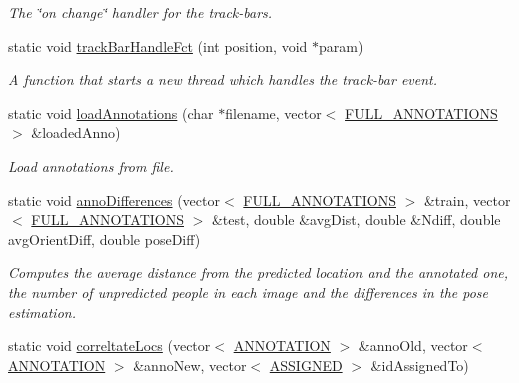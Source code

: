 \begin{DoxyCompactItemize}
\begin{DoxyCompactList}\small\item\em The \char`\"{}on change\char`\"{} handler for the track-\/bars. \item\end{DoxyCompactList}\item 
\hypertarget{classannotationsHandle_a6449c025574a5b0aae30a9b38fe598d6}{
static void \hyperlink{classannotationsHandle_a6449c025574a5b0aae30a9b38fe598d6}{trackBarHandleFct} (int position, void $\ast$param)}
\label{classannotationsHandle_a6449c025574a5b0aae30a9b38fe598d6}

\begin{DoxyCompactList}\small\item\em A function that starts a new thread which handles the track-\/bar event. \item\end{DoxyCompactList}\item 
\hypertarget{classannotationsHandle_a85794f6ce173c1109237e357b85fb884}{
static void \hyperlink{classannotationsHandle_a85794f6ce173c1109237e357b85fb884}{loadAnnotations} (char $\ast$filename, vector$<$ \hyperlink{structannotationsHandle_1_1FULL__ANNOTATIONS}{FULL\_\-ANNOTATIONS} $>$ \&loadedAnno)}
\label{classannotationsHandle_a85794f6ce173c1109237e357b85fb884}

\begin{DoxyCompactList}\small\item\em Load annotations from file. \item\end{DoxyCompactList}\item 
\hypertarget{classannotationsHandle_a04cf8b0e62ecb0b9f4556e489f126195}{
static void \hyperlink{classannotationsHandle_a04cf8b0e62ecb0b9f4556e489f126195}{annoDifferences} (vector$<$ \hyperlink{structannotationsHandle_1_1FULL__ANNOTATIONS}{FULL\_\-ANNOTATIONS} $>$ \&train, vector$<$ \hyperlink{structannotationsHandle_1_1FULL__ANNOTATIONS}{FULL\_\-ANNOTATIONS} $>$ \&test, double \&avgDist, double \&Ndiff, double avgOrientDiff, double poseDiff)}
\label{classannotationsHandle_a04cf8b0e62ecb0b9f4556e489f126195}

\begin{DoxyCompactList}\small\item\em Computes the average distance from the predicted location and the annotated one, the number of unpredicted people in each image and the differences in the pose estimation. \item\end{DoxyCompactList}\item 
\hypertarget{classannotationsHandle_aa710024aca2550b64d0c76020888c6ab}{
static void \hyperlink{classannotationsHandle_aa710024aca2550b64d0c76020888c6ab}{correltateLocs} (vector$<$ \hyperlink{structannotationsHandle_1_1ANNOTATION}{ANNOTATION} $>$ \&annoOld, vector$<$ \hyperlink{structannotationsHandle_1_1ANNOTATION}{ANNOTATION} $>$ \&annoNew, vector$<$ \hyperlink{structannotationsHandle_1_1ASSIGNED}{ASSIGNED} $>$ \&idAssignedTo)}
\label{classannotationsHandle_aa710024aca2550b64d0c76020888c6ab}


\end{DoxyCompactItemize}

